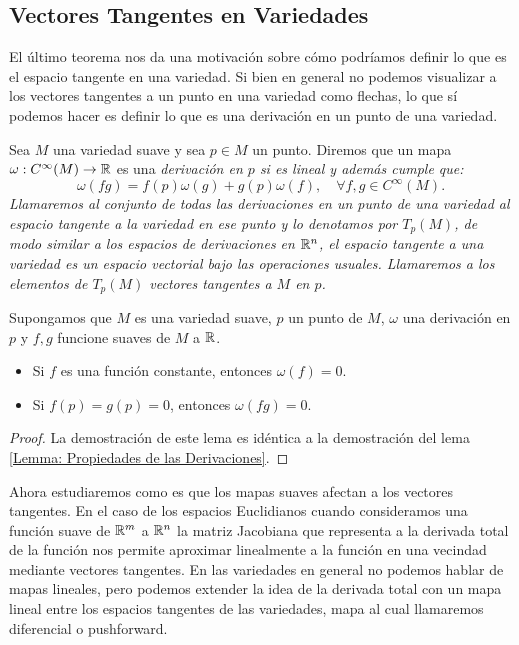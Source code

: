 \subsection{Vectores Tangentes en Variedades}\label{Subsección: Espacios Tangentes en Variedades}
El último teorema nos da una motivación sobre cómo podríamos definir lo que es el espacio tangente en una variedad. Si bien en general no podemos visualizar a los vectores tangentes a un punto en una variedad como flechas, lo que sí podemos hacer es definir lo que es una derivación en un punto de una variedad.

\begin{definition}
	Sea $M$ una variedad suave y sea $p \in M$ un punto. Diremos que un mapa $\omega: C^{\infty}(M) \to \mathbb{R}$ es una \it{derivación} en $p$ si es lineal y además cumple que:
	\[
		\omega(fg) = f(p)\omega(g) + g(p)\omega(f), \quad \forall f,g \in C^{\infty}(M).
	\]
	Llamaremos al conjunto de todas las derivaciones en un punto de una variedad al \it{espacio tangente} a la variedad en ese punto y lo denotamos por $T_p (M)$, de modo similar a los espacios de derivaciones en $\mathbb{R}^n$, el espacio tangente a una variedad es un espacio vectorial bajo las operaciones usuales. Llamaremos a los elementos de $T_p(M)$ \it{vectores tangentes a $M$ en $p$}.
\end{definition}

\begin{lemma}\label{Lemma: Propiedades De Las Derivaciones En Variedades}
	Supongamos que $M$ es una variedad suave, $p$ un punto de $M$, $\omega$ una derivación en $p$ y $f,g$ funcione suaves de $M$ a $\mathbb{R}$.
	\begin{itemize}
		\item Si $f$ es una función constante, entonces $\omega(f) = 0$.
		\item Si $f(p) = g(p) = 0$, entonces $\omega(fg) = 0$.
	\end{itemize}
\end{lemma}

\begin{proof}
	La demostración de este lema es idéntica a la demostración del lema \ref{Lemma: Propiedades de las Derivaciones}.
\end{proof}

Ahora estudiaremos como es que los mapas suaves afectan a los vectores tangentes. En el caso de los espacios Euclidianos cuando consideramos una función suave de $\mathbb{R}^m$ a $\mathbb{R}^n$ la matriz Jacobiana que representa a la derivada total de la función nos permite aproximar linealmente a la función en una vecindad mediante vectores tangentes. En las variedades en general no podemos hablar de mapas lineales, pero podemos extender la idea de la derivada total con un mapa lineal entre los espacios tangentes de las variedades, mapa al cual llamaremos diferencial o pushforward.

